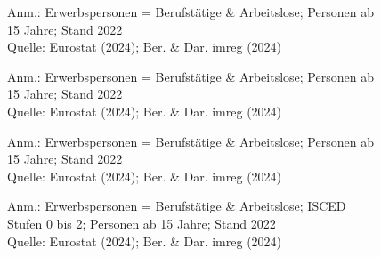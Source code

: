 \begin{figure}[p]
	{\centering {}}
	\label{map:erwerbspers}
	\begin{spacing}{1} \scriptsize
		Anm.: Erwerbspersonen = Berufstätige \& Arbeitslose; Personen ab 15 Jahre; Stand 2022\\
		Quelle: Eurostat (2024); Ber. \& Dar. imreg (2024) \end{spacing}
\end{figure}


\begin{figure}[p]
	{\centering {}}
	\label{map:erwerbspersfrauen}
	\begin{spacing}{1} \scriptsize
		Anm.: Erwerbspersonen = Berufstätige \& Arbeitslose; Personen ab 15 Jahre; Stand 2022\\
		Quelle: Eurostat (2024); Ber. \& Dar. imreg (2024) \end{spacing}
\end{figure}


\begin{figure}[p]
	{\centering {}}
	\label{map:erwerbspersmaenner}
	\begin{spacing}{1} \scriptsize
		Anm.: Erwerbspersonen = Berufstätige \& Arbeitslose; Personen ab 15 Jahre; Stand 2022\\
		Quelle: Eurostat (2024); Ber. \& Dar. imreg (2024) \end{spacing}
\end{figure}


\begin{figure}[p]
	{\centering {}}
	\label{map:erwerbspersniedrig}
	\begin{spacing}{1} \scriptsize
		Anm.: Erwerbspersonen = Berufstätige \& Arbeitslose; ISCED Stufen 0 bis 2; Personen ab 15 Jahre; Stand 2022\\
		Quelle: Eurostat (2024); Ber. \& Dar. imreg (2024) \end{spacing}
\end{figure}


